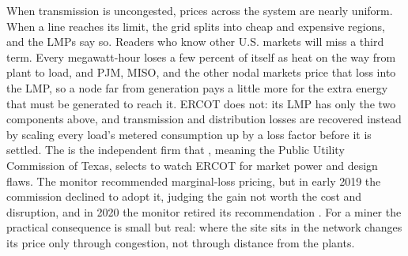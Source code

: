 When transmission is uncongested, prices across the system are nearly uniform. When a line reaches its limit, the grid splits into cheap and expensive regions, and the LMPs say so. Readers who know other U.S. markets will miss a third term. Every megawatt-hour loses a few percent of itself as heat on the way from plant to load, and PJM, MISO, and the other nodal markets price that loss into the LMP, so a node far from generation pays a little more for the extra energy that must be generated to reach it. ERCOT does not: its LMP has only the two components above, and transmission and distribution losses are recovered instead by scaling every load's metered consumption up by a loss factor before it is settled. The  is the independent firm that , meaning the Public Utility Commission of Texas, selects to watch ERCOT for market power and design flaws. The monitor recommended marginal-loss pricing, but in early 2019 the commission declined to adopt it, judging the gain not worth the cost and disruption, and in 2020 the monitor retired its recommendation \autocite{ercot2026protocols,potomac2019som}. %
For a miner the practical consequence is small but real: where the site sits in the network changes its price only through congestion, not through distance from the plants.

